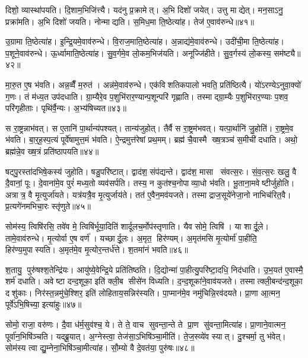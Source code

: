 दिशो॒ व्यास्था॑पयति। दि॒शाम॒भिजि॑त्त्यै। यद॑नु प्र॒क्रामेत्। अ॒भि दिशो॑ जयेत्। उत्तु माद्येत्। मन॒साऽनु॒ प्रक्रा॑मति। अ॒भि दिशो॑ जयति। नोन्माद्यति। स॒मिध॒मा ति॒ष्ठेत्या॑ह। तेज॑ ए॒वाव॑रुन्धे॥४१॥

उ॒ग्रामा ति॒ष्ठेत्या॑ह। इ॒न्द्रि॒यमे॒वाव॑रुन्धे। वि॒राज॒माति॒ष्ठेत्या॑ह। अ॒न्नाद्य॑मे॒वाव॑रुन्धे। उदी॑ची॒मा ति॒ष्ठेत्या॑ह। प॒शूने॒वाव॑रुन्धे। ऊ॒र्ध्वामाति॒ष्ठेत्या॑ह। सु॒व॒र्गमे॒व लो॒कम॒भिज॑यति। अनूज्जि॑हीते। सु॒व॒र्गस्य॑ लो॒कस्य॒ सम॑ष्ट्यै॥४२॥

मा॒रु॒त ए॒ष भ॑वति। अन्न॒व्वैँ म॒रुत॑। अन्न॑मे॒वाव॑रुन्धे। एक॑विशतिकपालो भवति॒ प्रति॑ष्ठित्यै। यो॑ऽरण्येऽनुवा॒क्यो॑ ग॒णः। तं म॑ध्य॒त उप॑दधाति। ग्रा॒म्यैरे॒व प॒शुभि॑रार॒ण्यान्प॒शून्परि॑ गृह्णाति। तस्माद्ग्रा॒म्यैः प॒शुभि॑रार॒ण्याः प॒शव॒ परि॑गृहीताः। पृथि॑र्वै॒न्यः। अ॒भ्य॑षिच्यत॥४३॥

स रा॒ष्ट्रन्नाभ॑वत्। स ए॒तानि॑ पा॒र्थान्य॑पश्यत्। तान्य॑जुहोत्। तैर्वै स रा॒ष्ट्रम॑भवत्। यत्पा॒र्थानि॑ जु॒होति॑। रा॒ष्ट्रमे॒व भ॑वति। बा॒र्॒ह॒स्प॒त्यं पूर्वे॑षामुत्त॒मं भ॑वति। ऐ॒न्द्रमुत्त॑रेषां प्रथ॒मम्। ब्रह्म॑ चै॒वास्मै ख्ष॒त्रञ्च॑ स॒मीची॑ दधाति। अथो॒ ब्रह्म॑न्ने॒व ख्ष॒त्रं प्रति॑ष्ठापयति॥४४॥

षट्पु॒रस्ता॑दभिषे॒कस्य॑ जुहोति। षडु॒परि॑ष्टात्। द्वाद॑श॒ संप॑द्यन्ते। द्वाद॑श॒ मासा संवत्स॒रः। सं॒व॒त्स॒रः खलु॒ वै दै॒वानां॒ पूः। दे॒वाना॑मे॒व पुरं॑ मध्य॒तो व्यव॑सर्पति। तस्य॒ न कुत॑श्च॒नोपाव्या॒धो भ॑वति। भू॒ताना॒मवेष्टीर्जुहोति। अत्रात्र॒ वै मृ॒त्युर्जा॑यते। यत्र॑यत्रै॒व मृ॒त्युर्जाय॑ते। तत॑ ए॒वैन॒मव॑यजते। तस्माद्राज॒सूये॑नेजा॒नो नाभिच॑रित॒वै। प्र॒त्यगे॑नमभिचा॒रः स्तृ॑णुते॥४५॥\anuvakamend[रु॒न्धे॒ सम॑ष्ट्या असिच्यत स्थापयति॒ जाय॑ते॒ पञ्च॑ च]

सोम॑स्य॒ त्विषि॑रसि॒ तवे॑व मे॒ त्विषि॑र्भूया॒दिति॑ शार्दूलच॒र्मोप॑स्तृणाति। यैव सोमे॒ त्विषि॑। या शार्दू॒ले। तामे॒वाव॑रुन्धे। मृ॒त्योर्वा ए॒ष वर्ण॑। यच्छार्दू॒लः। अ॒मृत॒ हिर॑ण्यम्। अ॒मृत॑मसि मृ॒त्योर्मा॑ पा॒हीति॒ हिर॑ण्य॒मुपास्यति। अ॒मृत॑मे॒व मृ॒त्योर॒न्तर्ध॑त्ते। श॒तमा॑नं भवति॥४६॥

श॒तायु॒ पुरु॑षश्श॒तेन्द्रि॑यः। आयु॑ष्ये॒वेन्द्रि॒ये प्रति॑तिष्ठति। दि॒द्योन्मा॑ पा॒हीत्यु॒परि॑ष्टा॒दधि॒ निद॑धाति। उ॒भ॒यत॑ ए॒वास्मै॒ शर्म॑ दधाति। अवेष्टा दन्द॒शूका॒ इति॑ क्ली॒ब सीसे॑न विध्यति। द॒न्द॒शूका॑ने॒वाव॑यजते। तस्मात्क्ली॒बन्द॑न्द॒शूका॒ दशु॑काः। निर॑स्त॒न्नमु॑चे॒श्शिर॒ इति॑ लोहिताय॒सन्निर॑स्यति। पा॒प्मान॑मे॒व नमु॑चिन्नि॒रव॑दयते। प्रा॒णा आ॒त्मन॒ पूर्वे॑ऽभि॒षिच्या॒ इत्या॑हुः॥४७॥

सोमो॒ राजा॒ वरु॑णः। दै॒वा ध॑र्म॒सुव॑श्च॒ ये। ते ते॒ वाच सुवन्ता॒न्ते ते प्रा॒ण सु॑वन्ता॒मित्या॑ह। प्रा॒णाने॒वात्मन॒ पूर्वा॑न॒भिषि॑ञ्चति। यद्ब्रू॒यात्। अ॒ग्नेस्त्वा॒ तेज॑सा॒ऽभिषि॑ञ्चा॒मीति॑। ते॒ज॒स्व्ये॑व स्यात्। दु॒श्चर्मा॒ तु भ॑वेत्। सोम॑स्य त्वा द्यु॒म्नेना॒भिषि॑ञ्चा॒मीत्या॑ह। सौ॒म्यो वै दे॒वत॑या॒ पुरु॑षः॥४८॥

